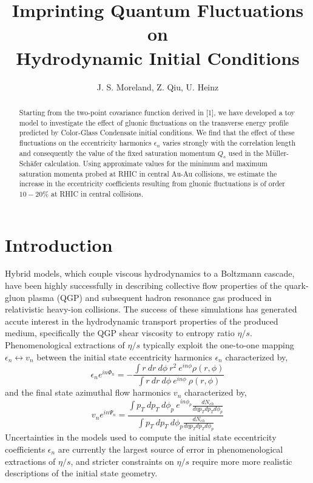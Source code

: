 \documentclass[a4paper,10pt]{elsarticle}
\title{Imprinting Quantum Fluctuations on  \\ Hydrodynamic Initial Conditions}
\author{J. S. Moreland, Z. Qiu, U. Heinz}
\begin{document}
\begin{abstract}
  Starting from the two-point covariance function derived in [1], we have developed a toy model to investigate the effect of gluonic 
fluctuations on the transverse energy profile predicted by Color-Glass Condensate initial conditions. We find that the effect of these fluctuations
on the eccentricity harmonics $\epsilon_{n}$ varies strongly with the correlation length and consequently the value of the fixed saturation momentum $Q_{s}$ 
used in the M\"uller-Sch\"afer calculation. Using approximate values for the minimum and maximum saturation momenta probed at RHIC in central Au-Au collisions, 
we estimate the increase in the eccentricity coefficients resulting from gluonic fluctuations is of order $10-20\%$ at RHIC in central collisions.

\end{abstract}

\maketitle

\section{Introduction}
Hybrid models, which couple viscous hydrodynamics to a Boltzmann cascade, have been highly successfully in describing collective flow properties of 
the quark-gluon plasma (QGP) and subsequent hadron resonance gas produced in relativistic heavy-ion collisions. The success of these simulations
has generated accute interest in the hydrodynamic transport properties of the produced medium, specifically the QGP shear viscosity to entropy ratio $\eta/s$. 
Phenomenological extractions of $\eta/s$ typically exploit the one-to-one mapping $\epsilon_{n}\leftrightarrow v_{n}$ between the initial state eccentricity harmonics $\epsilon_{n}$
characterized by,
\begin{equation}
 \epsilon_{n} e^{i n \Phi_n}= - \frac{\int r ~\!dr ~\!d\phi ~\!r^2 ~\!e^{i n \phi}\rho(r,\phi)}{   \int r ~\!dr ~\!d\phi ~\!e^{i n \phi} ~\! \rho(r,\phi)}
\end{equation}
and the final state azimuthal flow harmonics $v_{n}$ characterized by,
\begin{equation}
 v_{n} e^{i n \Psi_n}=\frac{\int p_T ~\!dp_T ~\!d\phi_p ~\!e^{i n \phi_p}\frac{dN_{ch}}{d\eta p_T dp_T d\phi_p}}{\int p_T ~\!dp_T ~\!d\phi_p \frac{dN_{ch}}{d\eta p_T dp_T d\phi_p}}
\end{equation}
Uncertainties in the models used to compute the initial state eccentricity coefficients $\epsilon_n$ are currently the largest source of error in phenomenological extractions of $\eta/s$, and 
stricter constraints on $\eta/s$ require more more realistic descriptions of the initial state geometry.
\end{document}
